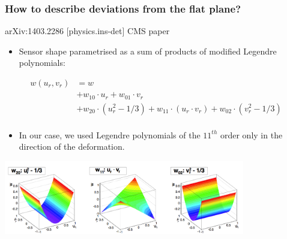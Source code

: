 \documentclass{beamer}
\begin{document}
  \begin{frame}
    \frametitle{How to describe deviations from the flat plane?}

    \vspace{-0.3cm}
    \begin{block}{arXiv:1403.2286 [physics.ins-det] CMS paper}
      \begin{itemize}
        \item Sensor shape parametrised as a sum of products of modified Legendre polynomials:
      \end{itemize}
      \vspace{-0.2cm}
      \[
        \begin{array}{rl}
            w(u_r,v_r) &= w \\ 
                       &+ w_{10} \cdot u_r + w_{01} \cdot v_r \\ 
                       &+ w_{20} \cdot (u_r^2-1/3) + w_{11} \cdot (u_r \cdot v_r) + w_{02} \cdot (v_r^2 - 1/3) \\
        \end{array}
      \]
      \vspace{-0.5cm}
      \begin{itemize}
        \item In our case, we used Legendre polynomials of the $11^{th}$ order only in the direction of the deformation. 
      \end{itemize}
    \end{block}

    \vspace{-0.3cm}
    \begin{center}
      \includegraphics[width = 10.5cm]{Pictures/lagrangianPlynomials.png}
    \end{center} 

  \end{frame}
\end{document}
